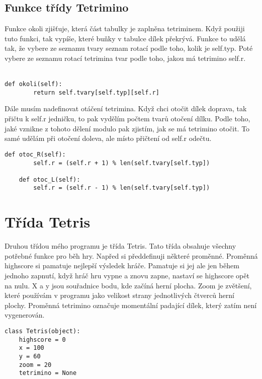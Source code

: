 \documentclass[12pt]{report}			%
\begin{document}
			\section{Funkce třídy Tetrimino}
Funkce okoli zjišťuje, která část tabulky je zaplněna tetriminem. Když použiji tuto funkci, tak vypíše, které buňky v tabulce dílek překrývá. Funkce to udělá tak, že vybere ze seznamu tvary seznam rotací podle toho, kolik je self.typ. Poté vybere ze seznamu rotací tetrimina tvar podle toho, jakou má tetrimino self.r. \\\\
\begin{lstlisting}[title={Program tetris.py}, caption={Funkce okoli}, 							label={lst:tetris.py}]
    def okoli(self):
        return self.tvary[self.typ][self.r]
\end{lstlisting}
Dále musím nadefinovat otáčení tetrimina. Když chci otočit dílek doprava, tak přičtu k self.r jedničku, to pak vydělím počtem tvarů otočení dílku. Podle toho, jaké vznikne z tohoto dělení modulo pak zjistím, jak se má tetrimino otočit. To samé udělám při otočení doleva, ale místo přičtení od self.r odečtu.   
\begin{lstlisting}[title={Program tetris.py}, caption={Otáčení tetrimina}, 							label={lst:tetris.py}]
    def otoc_R(self):
        self.r = (self.r + 1) % len(self.tvary[self.typ])

    def otoc_L(self):
        self.r = (self.r - 1) % len(self.tvary[self.typ])
\end{lstlisting}

		\chapter{Třída Tetris}
Druhou třídou mého programu je třída Tetris. Tato třída obsahuje všechny potřebné funkce pro běh hry. Napřed si předdefinuji některé proměnné. Proměnná highscore si pamatuje nejlepší výsledek hráče. Pamatuje si jej ale jen během jednoho zapnutí, když hráč hru vypne a znovu zapne, nastaví se highscore opět na nulu. X a y jsou souřadnice bodu, kde začíná herní plocha. Zoom je zvětšení, které používám v programu jako velikost strany jednotlivých čtverců herní plochy. Proměnná tetrimino označuje momentální padající dílek, který zatím není vygenerován.
\begin{lstlisting}[title={Program tetris.py}, caption={Proměnné třídy Tetris}, 							label={lst:tetris.py}]
class Tetris(object):
    highscore = 0
    x = 100
    y = 60
    zoom = 20
    tetrimino = None
\end{lstlisting}
\end{document}

